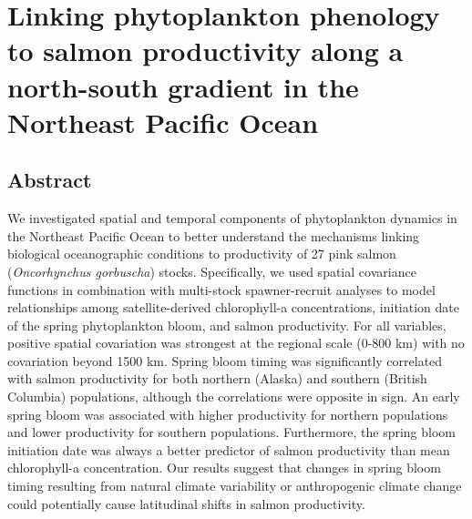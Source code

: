 
\chapter[Phytoplankton phenology and salmon productivity]{Linking
  phytoplankton phenology to salmon productivity along a north-south gradient in
  the Northeast Pacific Ocean\footnotemark[1]}

  

\section{Abstract}

We investigated spatial and temporal components of phytoplankton dynamics in the
Northeast Pacific Ocean to better understand the mechanisms linking biological
oceanographic conditions to productivity of 27 pink salmon (\emph{Oncorhynchus
gorbuscha}) stocks. Specifically, we used spatial covariance functions in
combination with multi-stock spawner-recruit analyses to model relationships
among satellite-derived chlorophyll-a concentrations, initiation date of the
spring phytoplankton bloom, and salmon productivity. For all variables, positive
spatial covariation was strongest at the regional scale (0-800 km) with no
covariation beyond 1500 km. Spring bloom timing was significantly correlated
with salmon productivity for both northern (Alaska) and southern (British
Columbia) populations, although the correlations were opposite in sign. An early
spring bloom was associated with higher productivity for northern populations
and lower productivity for southern populations. Furthermore, the spring bloom
initiation date was always a better predictor of salmon productivity than mean
chlorophyll-a concentration. Our results suggest that changes in spring bloom
timing resulting from natural climate variability or anthropogenic climate
change could potentially cause latitudinal shifts in salmon productivity.



